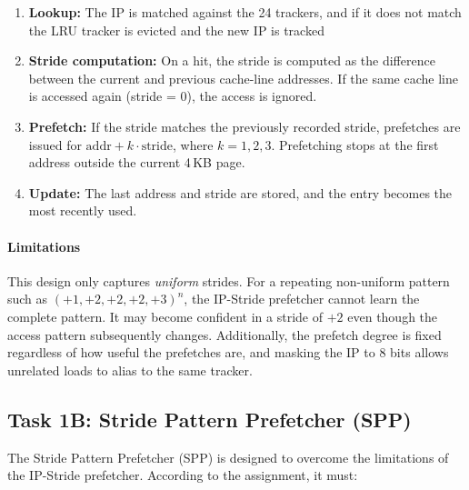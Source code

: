 \documentclass[11pt,a4paper]{article}
\begin{document}
\begin{enumerate}
  \item \textbf{Lookup:} The IP is matched against the 24 trackers, and if it does not match the LRU tracker is evicted and the new IP is tracked

  \item \textbf{Stride computation:} On a hit, the stride is computed
  as the difference between the current and previous cache-line
  addresses. If the same cache line is accessed again (stride = 0),
  the access is ignored.

  \item \textbf{Prefetch:} If the stride matches the previously
  recorded stride, prefetches are issued for
  $\text{addr} + k \cdot \text{stride}$, where $k = 1, 2, 3$.
  Prefetching stops at the first address outside the current 4\,KB
  page.

  \item \textbf{Update:} The last address and stride are stored,
  and the entry becomes the most recently used.
\end{enumerate}

\paragraph{Limitations}

This design only captures \emph{uniform} strides. For a repeating
non-uniform pattern such as $(+1, +2, +2, +2, +3)^n$, the IP-Stride
prefetcher cannot learn the complete pattern. It may become confident
in a stride of $+2$ even though the access pattern subsequently changes.
Additionally, the prefetch degree is fixed regardless of how useful
the prefetches are, and masking the IP to 8 bits allows unrelated
loads to alias to the same tracker.



\subsection{Task 1B: Stride Pattern Prefetcher (SPP)}

  The Stride Pattern Prefetcher (SPP) is designed to overcome the
  limitations of the IP-Stride prefetcher. According to the assignment,
  it must:
\end{document}

